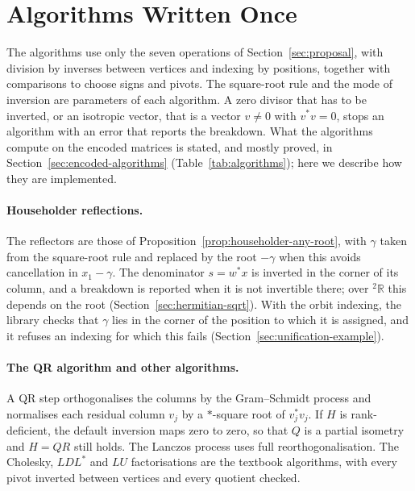 \documentclass[12pt, a4paper]{report}
\theoremstyle{plain}
\theoremstyle{definition}
\theoremstyle{remark}
\theoremstyle{plain}
\newcommand{\twoR}{{}^{2}\mathbb{R}}
\begin{document}
\section{Algorithms Written Once}
\label{sec:impl-algorithms}
The algorithms use only the seven operations of Section~\ref{sec:proposal}, with division by inverses between vertices and indexing by positions, together with comparisons to choose signs and pivots. The square-root rule and the mode of inversion are parameters of each algorithm. A zero divisor that has to be inverted, or an isotropic vector, that is a vector $v\neq0$ with $v^*v=0$, stops an algorithm with an error that reports the breakdown. What the algorithms compute on the encoded matrices is stated, and mostly proved, in Section~\ref{sec:encoded-algorithms} (Table~\ref{tab:algorithms}); here we describe how they are implemented.

\paragraph{Householder reflections.} The reflectors are those of Proposition~\ref{prop:householder-any-root}, with $\gamma$ taken from the square-root rule and replaced by the root $-\gamma$ when this avoids cancellation in $x_1-\gamma$. The denominator $s=w^*x$ is inverted in the corner of its column, and a breakdown is reported when it is not invertible there; over $\twoR$ this depends on the root (Section~\ref{sec:hermitian-sqrt}). With the orbit indexing, the library checks that $\gamma$ lies in the corner of the position to which it is assigned, and it refuses an indexing for which this fails (Section~\ref{sec:unification-example}).

\paragraph{The QR algorithm and other algorithms.} A QR step orthogonalises the columns by the Gram--Schmidt process and normalises each residual column $v_j$ by a $*$-square root of $v_j^*v_j$. If $H$ is rank-deficient, the default inversion maps zero to zero, so that $Q$ is a partial isometry and $H=QR$ still holds. The Lanczos process uses full reorthogonalisation. The Cholesky, $LDL^*$ and $LU$ factorisations are the textbook algorithms, with every pivot inverted between vertices and every quotient checked.
\end{document}
